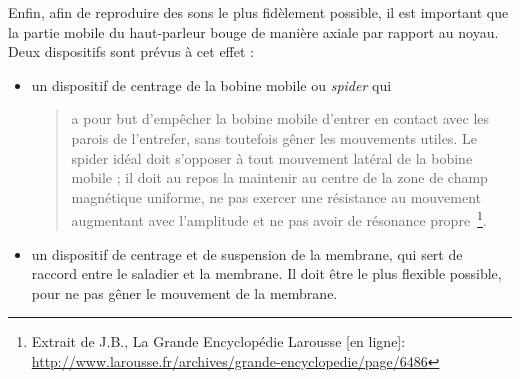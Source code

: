 Enfin, afin de reproduire des sons le plus fidèlement possible, il est important que la partie mobile du haut-parleur bouge de manière axiale par rapport au noyau.
Deux dispositifs sont prévus à cet effet \cite{Larousse} : 
\begin{itemize}
\item un dispositif de centrage de la bobine mobile ou \textit{spider} qui \begin{quote} a pour but d’empêcher la bobine mobile d’entrer en contact avec les parois de l’entrefer, sans toutefois gêner les mouvements utiles. Le spider idéal doit s’opposer à tout mouvement latéral de la bobine mobile ; il doit au repos la maintenir au centre de la zone de champ magnétique uniforme, ne pas exercer une résistance au mouvement augmentant avec l’amplitude et ne pas avoir de résonance propre~\footnote{Extrait de J.B., \og La Grande Encyclopédie Larousse [en ligne]\fg : \url{http://www.larousse.fr/archives/grande-encyclopedie/page/6486}}.\end{quote}
\item un dispositif de centrage et de suspension de la membrane, qui sert de raccord entre le saladier et la membrane. Il doit être le plus flexible possible, pour ne pas gêner le mouvement de la membrane.
\end{itemize}






